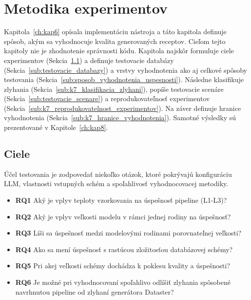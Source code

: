 
\chapter{Metodika experimentov}
\label{ch:kap7}

Kapitola~\ref{ch:kap6} opísala implementáciu nástroja a táto kapitola definuje spôsob, akým sa vyhodnocuje kvalita generovaných receptov. Cieľom tejto kapitoly nie je zhodnotenie správnosti kódu. Kapitola najskôr formuluje ciele experimentov (Sekcia~\ref{sub:ciele}) a definuje testovacie databázy (Sekcia~\ref{sub:testovacie_databazy}) a vrstvy vyhodnotenia ako aj celkové spôsoby testovania (Sekcia~\ref{sub:sposob_vyhodnotenia_uspesnosti}).  Následne klasifikuje zlyhania (Sekcia~\ref{sub:k7_klasifikacia_zlyhani}), popíše testovacie scenáre (Sekcia~\ref{sub:testovacie_scenare}) a reprodukovateľnosť experimentov (Sekcia~\ref{sub:k7_reprodukovatelnost_experimentov}). Na záver definuje hranice vyhodnotenia (Sekcia~\ref{sub:k7_hranice_vyhodnotenia}). Samotné výsledky sú prezentované v Kapitole~\ref{ch:kap8}.

\section{Ciele}
\label{sub:ciele}
Účel testovania je zodpovedať niekoľko otázok, ktoré pokrývajú konfiguráciu LLM, vlastnosti vstupných schém a spoľahlivosť vyhodnocovacej metodiky.

\begin{itemize}
    \item \textbf{RQ1} Aký je vplyv teploty vzorkovania na úspešnosť pipeline (L1-L3)?
    \item \textbf{RQ2} Aký je vplyv veľkosti modelu v rámci jednej rodiny na úspešnosť?
    \item \textbf{RQ3} Líši sa úspešnosť medzi modelovými rodinami porovnateľnej veľkosti?
    \item \textbf{RQ4} Ako sa mení úspešnosť s rastúcou zložitosťou databázovej schémy?
    \item \textbf{RQ5} Pri akej veľkosti schémy dochádza k poklesu kvality a úspešnosti?
    \item \textbf{RQ6} Je možné pri vyhodnocovaní spoľahlivo odlíšiť zlyhania spôsobené navrhnutou pipeline od zlyhaní generátora Dataster?
\end{itemize}

